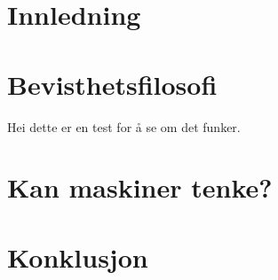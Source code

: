 
\renewcommand{\baselinestretch}{1.5}



\setlength{\parskip}{0em}
\maketitle
\thispagestyle{empty}
\addtocounter{page}{-1}
\newpage
\tableofcontents %
\setlength{\parskip}{1em}
\newpage



\section{Innledning}

\section{Bevisthetsfilosofi}
\lipsum[1]
Hei dette er en test for å se om det funker.

\section{Kan maskiner tenke?}
\lipsum[1-2]

\section{Konklusjon}

\autocite{Kiran2013}

\autocite{Nagel2003}

\printbibliography[heading=bibintoc] %

\newpage
\appendix



